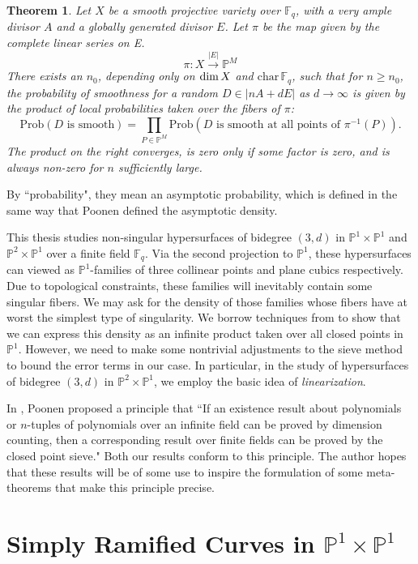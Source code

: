 \documentclass[12pt]{article}
\theoremstyle{plain}
\newtheorem{theorem}[equation]{Theorem}
\theoremstyle{definition}
\newcommand{\IF}{\mathbb{F}}
\newcommand{\IP}{\mathbb{P}}
\renewcommand\dim{{\rm dim\,}}
\newcommand{\<}{\langle}
\renewcommand{\>}{\rangle}
\newcommand{\Prob}{\mathrm{Prob}}
\begin{document}
\begin{theorem}
Let $X$ be a smooth projective variety over $\IF_q$, with a
very ample divisor $A$ and a globally generated divisor $E$. Let $\pi$ be the map given by the
complete linear series on E.
$$ \pi : X \stackrel{|E|}{\to} \IP^M $$
There exists an $n_0$, depending only on $\dim X$ and $\mathrm{char\,} \IF_q$, such that for $n \ge n_0$, the
probability of smoothness for a random $D \in |nA + dE|$ as $d \to \infty$ is given by the product of local probabilities taken over the fibers of $\pi$:
$$ \Prob(D \text{ is smooth}) = \prod_{P \in \IP^M} \Prob(D \text{ is smooth at all points of } \pi^{-1}(P)). $$
The product on the right converges, is zero only if some factor is zero, and is always non-zero for $n$ sufficiently large.
\end{theorem}

By ``probability", they mean an asymptotic probability, which is defined in the same way that Poonen defined the asymptotic density. 

This thesis studies non-singular hypersurfaces of bidegree $(3, d)$ in $\IP^1 \times \IP^1$ and $\IP^2 \times \IP^1$ over a finite field $\IF_q$. Via the second projection to $\IP^1$, these hypersurfaces can viewed as $\IP^1$-families of three collinear points and plane cubics respectively. Due to topological constraints, these families will inevitably contain some singular fibers. We may ask for the density of those families whose fibers have at worst the simplest type of singularity. We borrow techniques from \cite{Wood} to show that we can express this density as an infinite product taken over all closed points in $\IP^1$. However, we need to make some nontrivial adjustments to the sieve method to bound the error terms in our case. In particular, in the study of hypersurfaces of bidegree $(3, d)$ in $\IP^2 \times \IP^1$, we employ the basic idea of \textit{linearization}.

In \cite{expository}, Poonen proposed a principle that ``If an existence result about polynomials
or $n$-tuples of polynomials over an infinite field can be proved by dimension counting,
then a corresponding result over finite fields can be proved by the closed point sieve." Both our results conform to this principle. The author hopes that these results will be of some use to inspire the formulation of some meta-theorems that make this principle precise.  


\section{Simply Ramified Curves in $\IP^1 \times \IP^1$}
\label{simplify-ramified}
\end{document}
